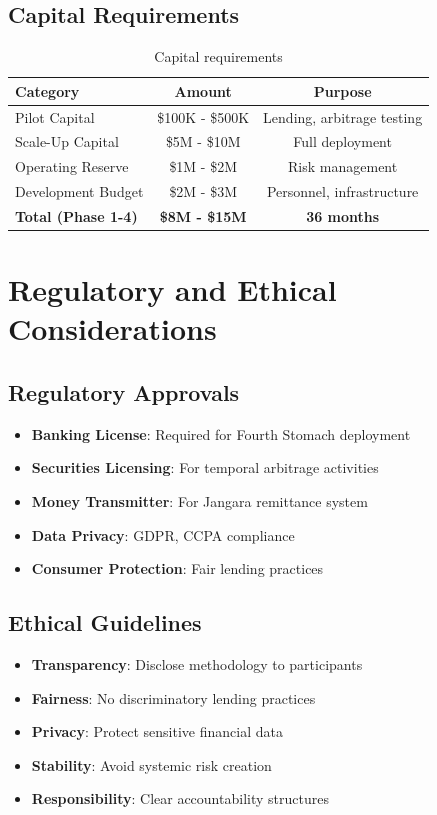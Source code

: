 \documentclass[12pt]{article}
\begin{document}
\subsection{Capital Requirements}

\begin{table}[h]
\centering
\begin{tabular}{|l|c|c|}
\hline
Category & Amount & Purpose \\
\hline
Pilot Capital & \$100K - \$500K & Lending, arbitrage testing \\
Scale-Up Capital & \$5M - \$10M & Full deployment \\
Operating Reserve & \$1M - \$2M & Risk management \\
Development Budget & \$2M - \$3M & Personnel, infrastructure \\
\hline
\textbf{Total (Phase 1-4)} & \textbf{\$8M - \$15M} & \textbf{36 months} \\
\hline
\end{tabular}
\caption{Capital requirements}
\end{table}

\section{Regulatory and Ethical Considerations}

\subsection{Regulatory Approvals}

\begin{itemize}
    \item \textbf{Banking License}: Required for Fourth Stomach deployment
    \item \textbf{Securities Licensing}: For temporal arbitrage activities
    \item \textbf{Money Transmitter}: For Jangara remittance system
    \item \textbf{Data Privacy}: GDPR, CCPA compliance
    \item \textbf{Consumer Protection}: Fair lending practices
\end{itemize}

\subsection{Ethical Guidelines}

\begin{itemize}
    \item \textbf{Transparency}: Disclose methodology to participants
    \item \textbf{Fairness}: No discriminatory lending practices
    \item \textbf{Privacy}: Protect sensitive financial data
    \item \textbf{Stability}: Avoid systemic risk creation
    \item \textbf{Responsibility}: Clear accountability structures
\end{itemize}
\end{document}

